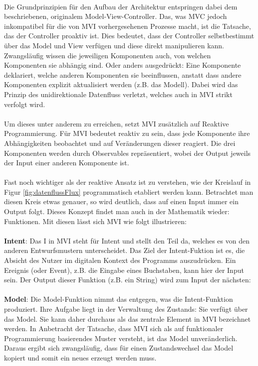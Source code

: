 \\
Die Grundprinzipien für den Aufbau der Architektur entspringen dabei dem beschriebenen, originalem Model-View-Controller. Das,
was MVC jedoch inkompatibel für die von MVI vorhergesehenen Prozesse macht, ist die Tatsache, das der Controller proaktiv ist. Dies bedeutet, dass der Controller selbstbestimmt über das Model und View verfügen und diese direkt manipulieren kann. Zwangsläufig wissen die jeweiligen Komponenten auch, von welchen Komponenten sie abhängig sind. Oder anders ausgedrückt: Eine Komponente deklariert, welche anderen Komponenten sie beeinflussen, anstatt dass andere Komponenten explizit aktualisiert werden (z.B. das Modell). Dabei wird das Prinzip des unidirektionale Datenfluss verletzt, welches auch in MVI strikt verfolgt wird. 
\\
\\
Um dieses unter anderem zu erreichen, setzt MVI zusätzlich auf Reaktive Programmierung. Für MVI bedeutet reaktiv zu sein, dass jede Komponente ihre Abhängigkeiten beobachtet und auf Veränderungen dieser reagiert. Die drei Komponenten werden durch Observables repräsentiert, wobei der Output jeweils der Input einer anderen Komponente ist.
\\
\\
Fast noch wichtiger als der reaktive Ansatz ist zu verstehen, wie der Kreislauf in Figur \ref{fig:datenflussFlux} programmatisch etabliert werden kann. Betrachtet man diesen Kreis etwas genauer, so wird deutlich, dass auf einen Input immer ein Output folgt. Dieses Konzept findet man auch in der Mathematik wieder: Funktionen. Mit diesen lässt sich MVI wie folgt illustrieren:
\\
\\
\textbf{Intent}: Das I in MVI steht für Intent und stellt den Teil da, welches es von den anderen Entwurfsmustern unterscheidet. Das Ziel der Intent-Fuktion ist es, die Absicht des Nutzer im digitalen Kontext des Programms auszudrücken.
Ein Ereignis (oder Event), z.B. die Eingabe eines Buchstaben, kann hier der Input sein.
Der Output dieser Funktion (z.B. ein String) wird zum Input der nächsten:
\\
\\
\textbf{Model}: Die Model-Funktion nimmt das entgegen, was die Intent-Funktion produziert. Ihre Aufgabe liegt in der Verwaltung des Zustands: Sie verfügt über das Model. Sie kann daher durchaus als das zentrale Element in MVI bezeichnet werden. In Anbetracht der Tatsache, dass MVI sich als auf funktionaler Programmierung basierendes Muster versteht, ist das Model unveränderlich. Daraus ergibt sich zwangsläufig, dass für einen Zustandswechsel das Model kopiert und somit ein neues erzeugt werden muss. 
